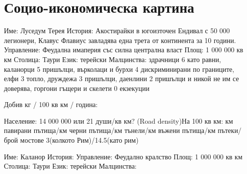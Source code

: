\chapter{Социо-икономическа картина}
%

Име: Луседум Терея
История: Акостирайки в югоизточен Ендивал с 50 000 легионери, Клавус Флавиус завладява една трета от континента за 10 години.
Управление: Феудална имаперия със силна централна власт
Площ: 1 000 000 кв км
Столица: Таури
Език: терейски
Малцинства: здрачници 6 като равни, каланорци 5 пришълци, върколаци и бурхи 4 дискриминирани по границите, елфи 3 топло, друждежа 3 пришълци, даенлини 2 пришълци и никой не им се доверява, горгони гъщери и скелети 0 екзекуции

Добив кг / 100 кв км / година: 

Население: 14 000 000 или 21 души/кв км?
(Road density)На 100 кв км: км павирани пътища/км черни пътища/км тънели/км въжени пътища/км пътеки/брой мостове
3(колкото Рим)/14.5(като рим)


Име: Каланор
История: 
Управление: Феудално кралство
Площ: 1 000 000 кв км
Столица: Таури
Език: терейски
Малцинства:
